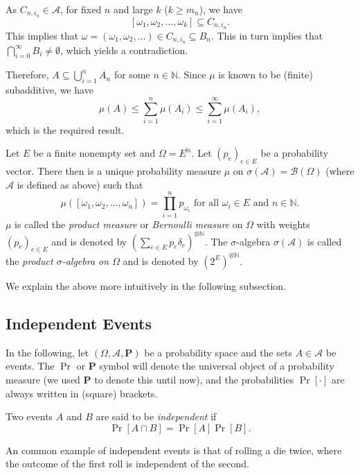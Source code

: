 As $C_{n,i_n}\in\mathcal{A}$, for fixed $n$ and large $k$ ($k\geq m_n$), we have $$[\omega_1,\omega_2,\ldots,\omega_k]\subseteq C_{n,i_n}.$$
This implies that $\omega=(\omega_1,\omega_2,\ldots)\in C_{n,i_n}\subseteq B_n$. This in turn implies that $\bigcap_{i=0}^\infty B_i\neq\emptyset$, which yields a contradiction.

Therefore, $A\subseteq\bigcup_{i=1}^n A_n$ for some $n\in\mathbb{N}$. Since $\mu$ is known to be (finite) subadditive, we have
$$\mu(A)\leq \sum_{i=1}^n\mu(A_i)\leq \sum_{i=1}^\infty \mu(A_i),$$
which is the required result.

\begin{definition}
\label{defProductMeasure}
    Let $E$ be a finite nonempty set and $\Omega=E^\mathbb{N}$. Let $(p_e)_{e\in E}$ be a probability vector. There then is a unique probability measure $\mu$ on $\sigma(\mathcal{A})=\mathcal{B}(\Omega)$ (where $\mathcal{A}$ is defined as above) such that
    $$\mu([\omega_1,\omega_2,\ldots,\omega_n])=\prod_{i=1}^n p_{\omega_i}\text{ for all $\omega_i\in E$ and $n\in\mathbb{N}$}.$$
    $\mu$ is called the \textit{product measure} or \textit{Bernoulli measure} on $\Omega$ with weights $(p_e)_{e\in E}$ and is denoted by $\left(\sum_{e\in E}p_e\delta_e\right)^{\otimes\mathbb{N}}$. The $\sigma$-algebra $\sigma(\mathcal{A})$ is called the \textit{product $\sigma$-algebra on $\Omega$} and is denoted by $(2^E)^{\otimes\mathbb{N}}$.
\end{definition}

We explain the above more intuitively in the following subsection.

\subsection{Independent Events}

In the following, let $(\Omega,\mathcal{A},\textbf{P})$ be a probability space and the sets $A\in\mathcal{A}$ be events. The $\Pr$ or $\textbf{P}$ symbol will denote the universal object of a probability measure (we used $\textbf{P}$ to denote this until now), and the probabilities $\Pr[\cdot]$ are always written in (square) brackets.
    
\begin{definition}
    Two events $A$ and $B$ are said to be \textit{independent} if
    $$\Pr[A\cap B] = \Pr[A]\Pr[B].$$
\end{definition}

An common example of independent events is that of rolling a die twice, where the outcome of the first roll is independent of the second.

